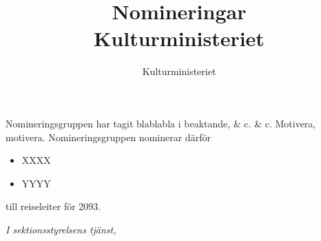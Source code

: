 \documentclass{fclass}
\title{Nomineringar\\
 \normalsize{Kulturministeriet}}
\author{Kulturministeriet}
\begin{document}
Nomineringsgruppen har tagit blablabla i beaktande, \& c. \& c. Motivera, motivera. Nomineringsgruppen nominerar därför
\begin{itemize}
\item XXXX
\item YYYY
\end{itemize}
till reiseleiter för 2093.

\vspace*{10mm}

\begin{signblock}
\emph{I sektionsstyrelsens tjänst,}

\end{signblock}
\end{document}
